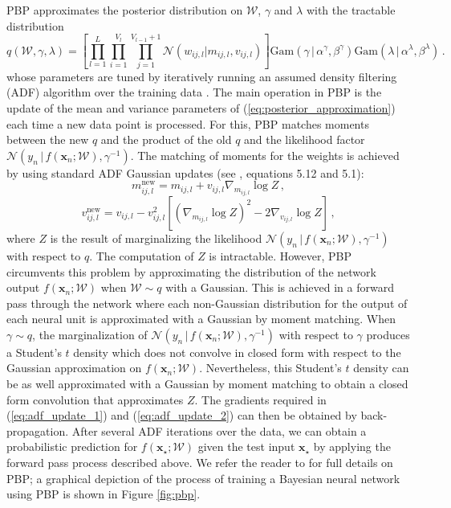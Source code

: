 PBP approximates the posterior distribution on $\mathcal{W}$, $\gamma$ and $\lambda$ with the tractable distribution
\begin{equation}
q(\mathcal{W},\gamma, \lambda) = \left[ \prod_{l=1}^L\! \prod_{i=1}^{V_l}\! 
\prod_{j=1}^{V_{l\!-\!1}\!+\!1} \mathcal{N}(w_{ij,l}| m_{ij,l},v_{ij,l})\right ]
 \text{Gam}(\gamma \,|\, \alpha^\gamma, \beta^\gamma)
\text{Gam}(\lambda \,|\, \alpha^\lambda, \beta^\lambda)\,.\label{eq:posterior_approximation}
\end{equation}
whose parameters are tuned by iteratively running an assumed density filtering (ADF) algorithm over the training data \cite{Opper}. The main operation in PBP is the update of the mean and variance parameters of (\ref{eq:posterior_approximation})
each time a new data point is processed.
For this, PBP matches moments between
the new $q$ and the product of the old $q$ and the likelihood factor $\mathcal{N}(y_n \,|\, f(\mathbf{x}_n;\mathcal{W}),\gamma^{-1})$. The matching of moments for the weights is achieved by using standard ADF Gaussian updates (see \cite{minka2001family}, equations 5.12 and 5.1):
\begin{equation}
\label{eq:adf_update_1} m_{ij,l}^\text{new} =  m_{ij,l} + v_{ij,l} \nabla_{m_{ij,l}} \log Z \,,
\end{equation}
\begin{equation}
\label{eq:adf_update_2}v_{ij,l}^\text{new} = v_{ij,l} - v_{ij,l}^2 \left[ (\nabla_{m_{ij,l}} \log Z)^2 - 2 \nabla_{v_{ij,l}} \log Z \right]\,,
\end{equation}
where $Z$ is the result of marginalizing the likelihood $\mathcal{N}(y_n\,|\, f(\mathbf{x}_n;\mathcal{W}),\gamma^{-1})$ with
respect to $q$. The computation of $Z$ is intractable. However, PBP circumvents this problem by
approximating the distribution of the network output $f(\mathbf{x}_n;\mathcal{W})$ when $\mathcal{W} \sim q$ with a Gaussian.
This is achieved in a forward pass through the network where each non-Gaussian distribution for the output of each neural unit is approximated with a Gaussian by moment matching. When $\gamma\sim q$, the marginalization of $\mathcal{N}(y_n \,|\, f(\mathbf{x}_n;\mathcal{W}),\gamma^{-1})$  with respect to $\gamma$ produces a Student's $t$ density which does not convolve in closed form with respect to the Gaussian approximation on $f(\mathbf{x}_n;\mathcal{W})$. Nevertheless, this Student's $t$ density can be as well approximated with a Gaussian by moment matching to obtain a closed form convolution that approximates $Z$.
The gradients required in (\ref{eq:adf_update_1}) and (\ref{eq:adf_update_2}) can then be obtained by back-propagation.
After several ADF iterations over the data, we can obtain a probabilistic prediction for $f(\mathbf{x}_\star;\mathcal{W})$ given the test input $\mathbf{x}_\star$ by applying the forward pass process described above. We refer the reader to \cite{hernandez2015probabilistic} for full details on PBP; a graphical depiction of the process of training a Bayesian neural network using PBP is shown in Figure \ref{fig:pbp}.


